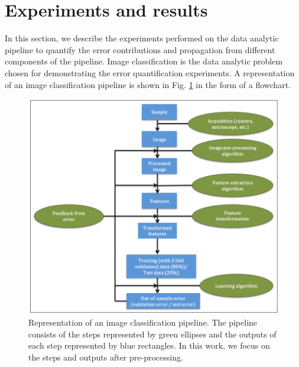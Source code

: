  

\section{Experiments and results}
\label{sec4}
In this section, we describe the experiments performed on the data analytic pipeline to quantify the error contributions and propagation from different components of the pipeline. Image classification is the data analytic problem chosen for demonstrating the error quantification experiments. A representation of an image classification pipeline is shown in Fig. \ref{fig:flowchart} in the form of a flowchart.  
\begin{figure}[H]
    \centering
    \includegraphics[scale=0.4]{img/EP/flowchart}
    \caption{Representation of an image classification pipeline. The pipeline consists of the steps represented by green ellipses and the outputs of each step represented by blue rectangles. In this work, we focus on the steps and outputs after pre-processing.}
    \label{fig:flowchart}
\end{figure}
